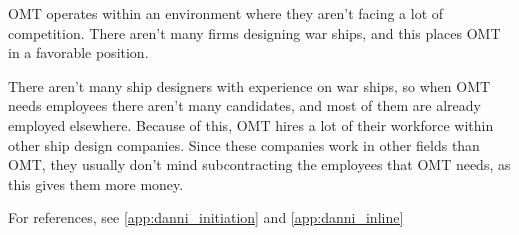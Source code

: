\label{app:OMT_environment}
OMT operates within an environment where they aren't facing a lot of competition. 
There aren't many firms designing war ships, and this places OMT in a favorable position.

There aren't many ship designers with experience on war ships, so when OMT needs employees there aren't many candidates, and most of them are already employed elsewhere.
Because of this, OMT hires a lot of their workforce within other ship design companies.
Since these companies work in other fields than OMT, they usually don't mind subcontracting the employees that OMT needs, as this gives them more money. 

For references, see \ref{app:danni_initiation} and \ref{app:danni_inline}